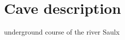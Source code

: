 \documentclass{article}%
\begin{document}
%
\normalsize%
\pagestyle{firstpage}%
\section{Cave description}%
\label{sec:Cavedescription}%
underground course of the river Saulx

%
\end{document}
